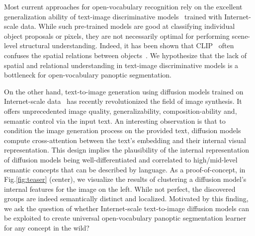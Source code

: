 \documentclass[10pt,twocolumn,letterpaper]{article}
\begin{document}
Most current approaches for open-vocabulary recognition rely on the excellent generalization ability of text-image discriminative models~\cite{radford2021clip, jia2021align} trained with Internet-scale data. While such pre-trained models are good at classifying individual object proposals or pixels, they are not necessarily optimal for performing scene-level structural understanding. Indeed, it has been shown that CLIP~\cite{radford2021clip} often confuses the spatial relations between objects~\cite{subramanian2022reclip}. We hypothesize that the lack of spatial and relational understanding in text-image discriminative models is a bottleneck for open-vocabulary panoptic segmentation. 


On the other hand, text-to-image generation using diffusion models trained on Internet-scale data~\cite{rombach2022ldm,saharia2022imagen,ramesh2022dalle2, balaji2022eDiffI, zhou2022latte} has recently revolutionized the field of image synthesis. It offers unprecedented image quality, generalizability, composition-ability and, semantic control via the input text. An interesting observation is that to condition the image generation process on the provided text, diffusion models compute cross-attention between the text's embedding and their internal visual representation. This design implies the plausibility of the internal representation of diffusion models being well-differentiated and correlated to high/mid-level semantic concepts that can be described by language. 
As a proof-of-concept, in Fig.\ref{fig:teaser} (center), we visualize the results of clustering a diffusion model's internal features for the image on the left. While not perfect, the discovered groups are indeed semantically distinct and localized. 
Motivated by this finding, we ask the question of whether Internet-scale text-to-image diffusion models can be exploited to create universal open-vocabulary panoptic segmentation learner for any concept in the wild?
\end{document}
